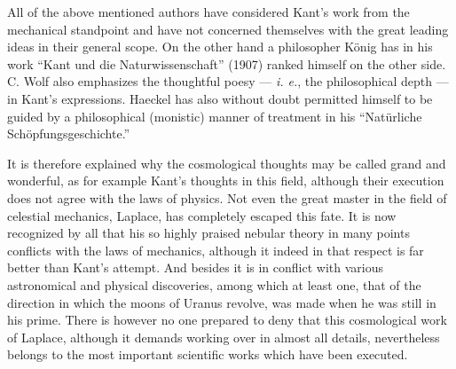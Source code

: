 \documentclass[a4paper, 11pt, oneside, polutonikogreek, english]{article}
\begin{document}
All of the above mentioned authors have considered Kant's work from the mechanical standpoint and have not concerned themselves with the great leading ideas in their general scope. On the other hand a philosopher König has in his work ``Kant und die Naturwissenschaft'' (1907) ranked himself on the other side. C. Wolf also emphasizes the thoughtful poesy --- \emph{i. e.}, the philosophical depth --- in Kant's expressions. Haeckel has also without doubt permitted himself to be guided by a philosophical (monistic) manner of treatment in his ``Natürliche Schöpfungsgeschichte.''

It is therefore explained why the cosmological thoughts may be called grand and wonderful, as for example Kant's thoughts in this field, although their execution does not agree with the laws of physics. Not even the great master in the field of celestial mechanics, Laplace, has completely escaped this fate. It is now recognized by all that his so highly praised nebular theory in many points conflicts with the laws of mechanics, although it indeed in that respect is far better than Kant's attempt. And besides it is in conflict with various astronomical and physical discoveries, among which at least one, that of the direction in which the moons of Uranus revolve, was made when he was still in his prime. There is however no one prepared to deny that this cosmological work of Laplace, although it demands working over in almost all details, nevertheless belongs to the most important scientific works which have been executed.
\end{document}
